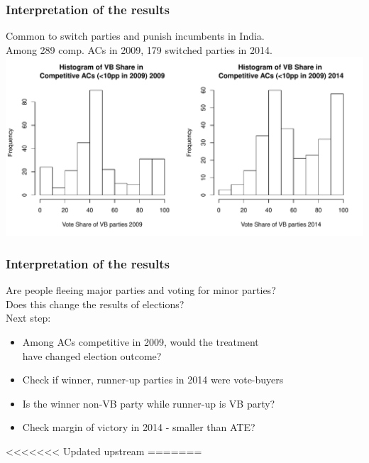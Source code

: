 \documentclass{beamer}
\begin{document}
\begin{frame}
\frametitle{Interpretation of the results}
Common to switch parties and punish incumbents in India.\\
Among 289 comp. ACs in 2009, 179 switched parties in 2014.\\
\includegraphics[scale=.45]{../Figures/VBcomp.pdf}
\end{frame}

\begin{frame}
\frametitle{Interpretation of the results}

Are people fleeing major parties and voting for minor parties?\\
Does this change the results of elections? \\
\medskip
Next step: 
\begin{itemize}
\item Among ACs competitive in 2009, would the treatment \\have changed election outcome?\\
\item Check if winner, runner-up parties in 2014 were vote-buyers
\item Is the winner non-VB party while runner-up is VB party?
\item Check margin of victory in 2014 - smaller than ATE?
\end{itemize}
\end{frame}


<<<<<<< Updated upstream
=======
\end{document}
